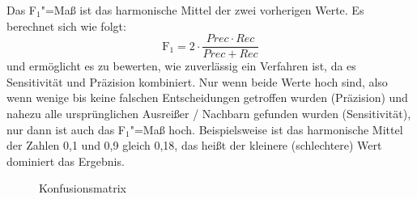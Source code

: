 Das F$_1$"=Maß ist das harmonische Mittel der zwei vorherigen Werte. Es berechnet sich wie folgt: \[\text{F}_1=2\cdot\frac{Prec \cdot Rec}{Prec + Rec}\] und ermöglicht es zu bewerten, wie zuverlässig ein Verfahren ist, da es Sensitivität und Präzision kombiniert. Nur wenn beide Werte hoch sind, also wenn wenige bis keine falschen Entscheidungen getroffen wurden (Präzision) und nahezu alle ursprünglichen Ausreißer / Nachbarn gefunden wurden (Sensitivität), nur dann ist auch das F$_1$"=Maß hoch. Beispielsweise ist das harmonische Mittel der Zahlen 0,1 und 0,9 gleich 0,18, das
heißt der kleinere (schlechtere) Wert dominiert das Ergebnis.
\begin{figure}[h]
\centering
 \caption{Konfusionsmatrix}
 \label{fig:konfusionsmatrix}
\end{figure}